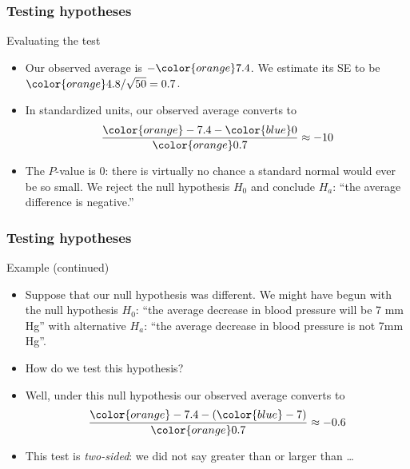 \documentclass[handout]{beamer}
\begin{document}

   \begin{frame} \frametitle{Testing hypotheses}

   \begin{block}
   {Evaluating  the test}
   \begin{itemize}

   \item Our observed average is ${-\color{orange} 7.4}$. We estimate its SE
   to be ${\color{orange} 4.8 / \sqrt{50}=0.7}$.

    \item In standardized units, our observed average converts to
    $$
    \frac{{\color{orange}-7.4} - {\color{blue} 0}}{\color{orange} 0.7} \approx - 10
    $$

   \item The {\color{orange} $P$-value} is 0: there is virtually no chance
   a standard normal would ever be so small. We reject the null hypothesis $H_0$
   and conclude $H_a$: ``the average difference is negative.''


   \end{itemize}
   \end{block}
   \end{frame}


   \begin{frame} \frametitle{Testing hypotheses}

   \begin{block}
   {Example (continued)}
   \begin{itemize}

   \item Suppose that our null hypothesis was different. We might
   have begun with the null hypothesis $H_0$: ``the average decrease in
   blood pressure will be 7 mm Hg'' with alternative $H_a$: ``the
   average decrease in blood pressure is not 7mm Hg''.

    \item How do we test this hypothesis?

    \item Well, under this null hypothesis our observed average converts to
    $$
    \frac{{\color{orange}-7.4} - ({\color{blue} -7})}{\color{orange} 0.7} \approx -0.6
    $$

    \item This test is {\em two-sided}: we did not say greater
    than or larger than \dots


   \end{itemize}
   \end{block}
   \end{frame}
\end{document}
